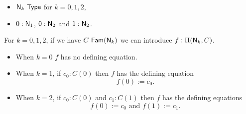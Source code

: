 \documentclass[10pt,a4paper]{article}
\newcommand{\Type}{{\sf Type}}
\newcommand{\NN}{{\sf N}}
\newcommand{\nn}{{\sf n}}
\newcommand{\Fam}{{\sf Fam}}
\newcommand{\pacomment}[1]{}
\begin{document}
\begin{itemize}
\item $\NN_k~\Type$ for $k=0,1,2$,
\item $0:\NN_1$, $0:\NN_2$ and $1:\NN_2$.
\end{itemize}
 For $k=0,1,2$, if we have $C~\Fam(\NN_k)$ we can introduce $f:\Pi(\NN_k,C)$.  
\begin{itemize}
\item When $k=0$ $f$ has no defining equation.  
\item When $k=1$, if $c_0:C(0)$ then $f$ has the defining equation
  \[ f(0):= c_0.\]
\item When $k=2$, if $c_0:C(0)$ and $c_1:C(1)$ then $f$ has the defining equations
  \[ f(0):= c_0\mbox{ and } f(1):=c_1.\]
\end{itemize}
\pacomment{%
\begin{itemize}
 \item The {\em empty type} $\NN_0$ is introduced as a primitive constant with the rule
\begin{itemize}
\item $\NN_0~\Type$
\end{itemize}

 If we have $C~\Fam(\NN_0)$ we can introduce $f:\Pi(\NN_0,C)$.  Note that in this case there is no defining equation.
In the special case where $C$ is $\lambda x.C_0$ where $C_0$ does not contain $x$ free, this represents the usual law of absurd elimination $\NN_0\rightarrow C_0$.

\medskip

\item The {\em one element type} $\NN_1$ is introduced, together with $0$, as primitive constants with the rules
\begin{itemize}
\item $\NN_1~\Type$,
\item $0:\NN_1$.
\end{itemize}
If we have $C~\Fam(\NN_1)$ and $c_0:C(0)$ we can introduce the defined function 
$f:(\Pi(\NN_1,C)$ with defining equation
  \[ f(0)~:=~c_0.\]
\item The {\em two element type} $\NN_2$ is introduced, together with $0,1$, as primitive constants with the rules
\begin{itemize}
\item $\NN_2~\Type$,
\item $0:\NN_2$ and $1:\NN_2$
\end{itemize}
If we have $C~\Fam(\NN_2)$, $c_0:C(\nn^2_0)$ and $c_1:C(\nn^2_1)$ we can introduce the defined function 
$f:\Pi(\NN_2,C)$ with defining equations
  \[ f(0)~:=~c_0\mbox{ and }f(1)~:=~ c_1.\]
Note that $\NN_2$ is the type of boolean values, here $0$ and $1$.
\end{itemize}
}%
\end{document}
